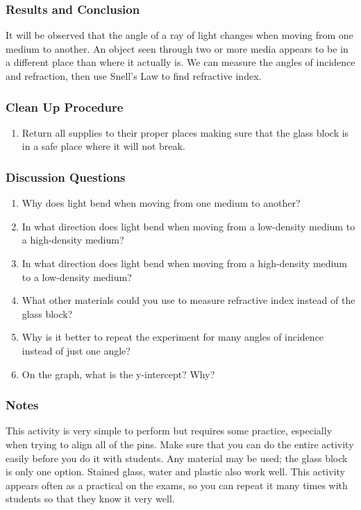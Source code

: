 \subsubsection*{Results and Conclusion}
It will be observed that the angle of a ray of light changes when moving from one medium to another.  An object seen through two or more media appears to be in a different place than where it actually is.  We can measure the angles of incidence and refraction, then use Snell's Law to find refractive index. 

\subsubsection*{Clean Up Procedure}
\begin{enumerate}
\item{Return all supplies to their proper places making sure that the glass block is in a safe place where it will not break.} 
\end{enumerate}

\subsubsection*{Discussion Questions}
\begin{enumerate}
\item{Why does light bend when moving from one medium to another?}
\item{In what direction does light bend when moving from a low-density medium to a high-density medium?}
\item{In what direction does light bend when moving from a high-density medium to a low-density medium?}
\item{What other materials could you use to measure refractive index instead of the glass block?}
\item{Why is it better to repeat the experiment for many angles of incidence instead of just one angle?}
\item{On the graph, what is the y-intercept? Why?}
\end{enumerate}

\subsubsection*{Notes}
This activity is very simple to perform but requires some practice, especially when trying to align all of the pins. Make sure that you can do the entire activity easily before you do it with students.  
Any material may be used; the glass block is only one option. Stained glass, water and plastic also work well.  
This activity appears often as a practical on the exams, so you can repeat it many times with students so that they know it very well.  

